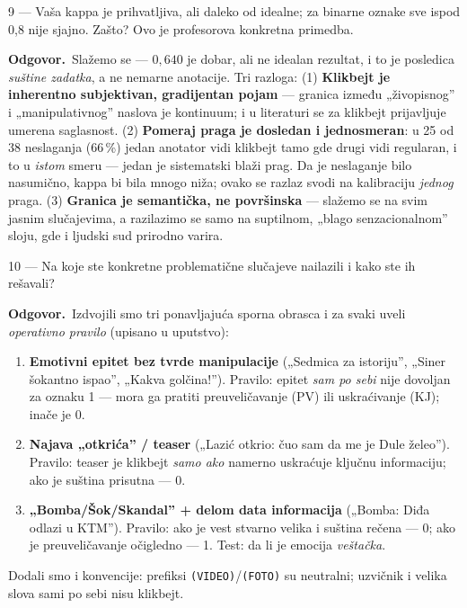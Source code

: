 \documentclass[11pt,a4paper]{article}
\newcommand{\kod}[1]{\texttt{#1}}
\newcommand{\odg}{\smallskip\noindent\textbf{Odgovor.}\ }
\begin{document}
\begin{pitanje}{9 --- Vaša kappa je prihvatljiva, ali daleko od idealne; za binarne oznake sve ispod 0,8 nije sjajno. Zašto?}
Ovo je profesorova konkretna primedba.
\end{pitanje}
\odg Slažemo se --- $0{,}640$ je dobar, ali ne idealan rezultat, i to je posledica
\emph{suštine zadatka}, a ne nemarne anotacije. Tri razloga: (1) \textbf{Klikbejt je
inherentno subjektivan, gradijentan pojam} --- granica između „živopisnog'' i
„manipulativnog'' naslova je kontinuum; i u literaturi se za klikbejt prijavljuje
umerena saglasnost. (2) \textbf{Pomeraj praga je dosledan i jednosmeran}: u 25 od 38
neslaganja (66\,\%) jedan anotator vidi klikbejt tamo gde drugi vidi regularan, i to u
\emph{istom} smeru --- jedan je sistematski blaži prag. Da je neslaganje bilo nasumično,
kappa bi bila mnogo niža; ovako se razlaz svodi na kalibraciju \emph{jednog} praga.
(3) \textbf{Granica je semantička, ne površinska} --- slažemo se na svim jasnim
slučajevima, a razilazimo se samo na suptilnom, „blago senzacionalnom'' sloju, gde i
ljudski sud prirodno varira.

\begin{pitanje}{10 --- Na koje ste konkretne problematične slučajeve nailazili i kako ste ih rešavali?}
\end{pitanje}
\odg Izdvojili smo tri ponavljajuća sporna obrasca i za svaki uveli \emph{operativno
pravilo} (upisano u uputstvo):
\begin{enumerate}[nosep]
  \item \textbf{Emotivni epitet bez tvrde manipulacije} („Sedmica za istoriju'',
    „Siner šokantno ispao'', „Kakva golčina!''). Pravilo: epitet \emph{sam po sebi}
    nije dovoljan za oznaku 1 --- mora ga pratiti preuveličavanje (PV) ili uskraćivanje
    (KJ); inače je 0.
  \item \textbf{Najava „otkrića'' / teaser} („Lazić otkrio: čuo sam da me je Dule
    želeo''). Pravilo: teaser je klikbejt \emph{samo ako} namerno uskraćuje ključnu
    informaciju; ako je suština prisutna --- 0.
  \item \textbf{„Bomba/Šok/Skandal'' + delom data informacija} („Bomba: Diđa odlazi u
    KTM''). Pravilo: ako je vest stvarno velika i suština rečena --- 0; ako je
    preuveličavanje očigledno --- 1. Test: da li je emocija \emph{veštačka}.
\end{enumerate}
Dodali smo i konvencije: prefiksi \kod{(VIDEO)}/\kod{(FOTO)} su neutralni; uzvičnik i
velika slova sami po sebi nisu klikbejt.
\end{document}
